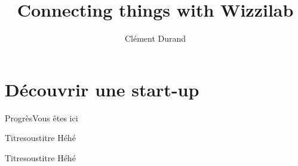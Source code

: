 \documentclass[aspectratio=169]{beamer}
\title[Stage de seconde année à l'École polytechnique]
      {Connecting things with Wizzilab}
\author{Clément Durand}
\newcommand{\progress}{%
  \begin{frame}{Progrès}{Vous êtes ici}
    \tableofcontents[currentsection]
  \end{frame}%
}
\begin{document}
\maketitle

\begin{frame}{\polytitresave}{\polysoustitresave}
  \tableofcontents
\end{frame}

\section[Découverte]{Découvrir une start-up}
\progress{}


\begin{frame}{Titre}{soustitre}
  Héhé
\end{frame}


\begin{frame}{Titre}{soustitre}
  Héhé
\end{frame}
\end{document}
